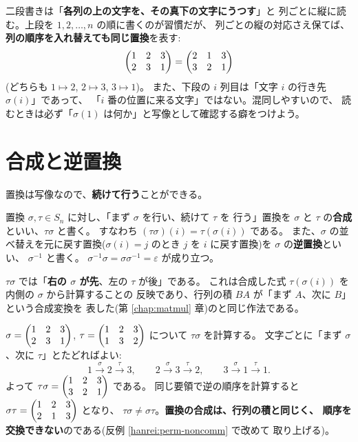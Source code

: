 \begin{chui}[二段書きの読み方]
二段書きは「\textbf{各列の上の文字を、その真下の文字にうつす}」と
列ごとに縦に読む。上段を $1, 2, \dots, n$ の順に書くのが習慣だが、
列ごとの縦の対応さえ保てば、\textbf{列の順序を入れ替えても同じ置換}を表す:
\[
\begin{pmatrix}1 & 2 & 3 \\ 2 & 3 & 1\end{pmatrix} = \begin{pmatrix}2 & 1 & 3 \\ 3 & 2 & 1\end{pmatrix}
\]
(どちらも $1 \mapsto 2$, $2 \mapsto 3$, $3 \mapsto 1$)。
また、下段の $i$ 列目は「文字 $i$ の行き先 $\sigma(i)$」であって、
「$i$ 番の位置に来る文字」ではない。混同しやすいので、
読むときは必ず「$\sigma(1)$ は何か」と写像として確認する癖をつけよう。
\end{chui}

\section{合成と逆置換}

置換は写像なので、\textbf{続けて行う}ことができる。

\begin{teigi}[合成・逆置換]
置換 $\sigma, \tau \in S_n$ に対し、「まず $\sigma$ を行い、続けて $\tau$ を
行う」置換を $\sigma$ と $\tau$ の\textbf{合成}といい、$\tau\sigma$ と書く。
すなわち $(\tau\sigma)(i) = \tau(\sigma(i))$ である。
また、$\sigma$ の並べ替えを元に戻す置換($\sigma(i) = j$ のとき
$j$ を $i$ に戻す置換)を $\sigma$ の\textbf{逆置換}といい、
$\sigma^{-1}$ と書く。
$\sigma^{-1}\sigma = \sigma\sigma^{-1} = \varepsilon$ が成り立つ。
\end{teigi}

\begin{chui}[合成は右から先に作用する]
$\tau\sigma$ では「\textbf{右の $\sigma$ が先}、左の $\tau$ が後」である。
これは合成した式 $\tau(\sigma(i))$ を内側の $\sigma$ から計算することの
反映であり、行列の積 $BA$ が「まず $A$、次に $B$」という合成変換を
表した(第 \ref{chap:matmul} 章)のと同じ作法である。
\end{chui}

\begin{rei}[合成の計算]\label{rei:perm-compose}
$\sigma = \begin{pmatrix}1 & 2 & 3 \\ 2 & 3 & 1\end{pmatrix}$,
$\tau = \begin{pmatrix}1 & 2 & 3 \\ 1 & 3 & 2\end{pmatrix}$ について $\tau\sigma$ を計算する。
文字ごとに「まず $\sigma$、次に $\tau$」とたどればよい:
\[
1 \xrightarrow{\ \sigma\ } 2 \xrightarrow{\ \tau\ } 3, \qquad
2 \xrightarrow{\ \sigma\ } 3 \xrightarrow{\ \tau\ } 2, \qquad
3 \xrightarrow{\ \sigma\ } 1 \xrightarrow{\ \tau\ } 1.
\]
よって $\tau\sigma = \begin{pmatrix}1 & 2 & 3 \\ 3 & 2 & 1\end{pmatrix}$ である。
同じ要領で逆の順序を計算すると
$\sigma\tau = \begin{pmatrix}1 & 2 & 3 \\ 2 & 1 & 3\end{pmatrix}$ となり、
$\tau\sigma \neq \sigma\tau$。\textbf{置換の合成は、行列の積と同じく、
順序を交換できない}のである(反例 \ref{hanrei:perm-noncomm} で改めて
取り上げる)。
\end{rei}

